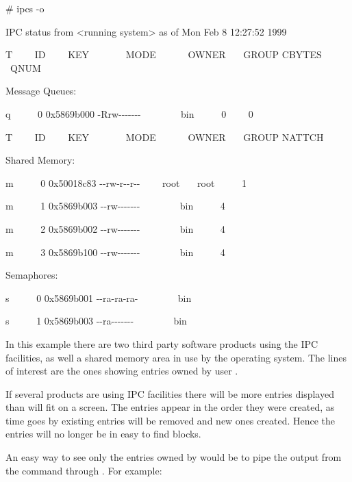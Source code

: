 \begin{exparasmall}

\# ipcs -o

\bigskip

IPC status from {\textless}running system{\textgreater} as of Mon Feb 8
12:27:52 1999

T \ \ \ \ ID \ \ \ \ KEY \ \ \ \ \ \ \ MODE \ \ \ \ \ \ OWNER
\ \ \ GROUP CBYTES \ QNUM

\bigskip

Message Queues:

q \ \ \ \ \ 0 0x5869b000 -Rrw-{}-{}-{}-{}-{}-{}- \ \ \ \batchusername{} \ \ \ \ bin
\ \ \ \ \ 0 \ \ \ \ 0

\bigskip

T \ \ \ \ ID \ \ \ \ KEY \ \ \ \ \ \ \ MODE \ \ \ \ \ \ OWNER
\ \ \ GROUP NATTCH

Shared Memory:

m \ \ \ \ \ 0 0x50018c83 -{}-rw-r-{}-r-{}- \ \ \ \ root \ \ \ root
\ \ \ \ \ 1

m \ \ \ \ \ 1 0x5869b003 -{}-rw-{}-{}-{}-{}-{}-{}- \ \ \ \batchusername{}
\ \ \ \ bin \ \ \ \ \ 4

m \ \ \ \ \ 2 0x5869b002 -{}-rw-{}-{}-{}-{}-{}-{}- \ \ \ \batchusername{}
\ \ \ \ bin \ \ \ \ \ 4

m \ \ \ \ \ 3 0x5869b100 -{}-rw-{}-{}-{}-{}-{}-{}- \ \ \ \batchusername{}
\ \ \ \ bin \ \ \ \ \ 4


\bigskip

Semaphores:

s \ \ \ \ \ 0 0x5869b001 -{}-ra-ra-ra- \ \ \ \batchusername{} \ \ \ \ bin

s \ \ \ \ \ 1 0x5869b003 -{}-ra-{}-{}-{}-{}-{}-{}- \ \ \ \batchusername{}
\ \ \ \ bin


\end{exparasmall}

In this example there are two third party software products using the IPC facilities, as well a shared memory area in use by the operating
system. The lines of interest are the ones showing entries owned by user \batchuser{}.

If several products are
using IPC facilities there will be more entries displayed than will fit on a screen. The entries appear in the order they were created, as time goes by existing entries will be removed and new ones created. Hence the entries will no longer be in easy to find blocks.

An easy way to see only the entries owned by \batchuser{} would be to pipe the output from the 
command through . For example:

